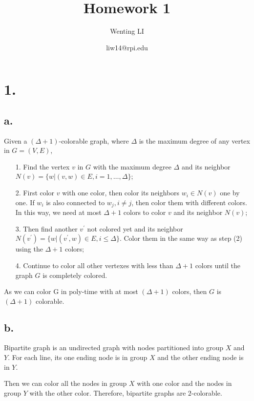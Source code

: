 \documentclass[a4paper,12pt]{article}
\begin{document}
	\title{Homework 1}
	\author{
			Wenting LI
		\and
			liw14@rpi.edu
			}
	\maketitle


 \section*{1. }
\subsection*{a. }
Given a $(\Delta+1)$-colorable graph, where $\Delta$ is the maximum degree of any vertex in $G=(V,E)$,

\begin{enumerate}
\item[1. ]Find the vertex $v$ in $G$ with the maximum degree $\Delta$ and its neighbor $N(v)=\{w | (v,w) \in E, i=1,\dots,\Delta \}$;

\item[2. ]First color $v$ with one color, then color its neighbors $w_i \in N(v)$ one by one. If $w_i$ is also connected to $w_j, i\neq j$, then color them with different colors. In this way, we need at most $\Delta +1$ colors to color $v$ and its neighbor  $N(v)$;

\item[3. ]Then find another $v^{\prime}$ not colored yet and its neighbor $N(v^{\prime})=\{w | (v^{\prime},w) \in E, i\leq \Delta \}$. Color them in the same way as step (2) using the $\Delta +1$ colors;

\item[4. ]Continue to color all other vertexes with less than $\Delta +1$ colors until the graph $G$ is completely colored.
\end{enumerate}

As we can color G in poly-time with at most $(\Delta +1)$ colors, then $G$ is $(\Delta +1)$ colorable.
\subsection*{b. }
Bipartite graph is an undirected graph with nodes partitioned into group $X$ and $Y$. For each line, its one ending node is in group $X$ and the other ending node is in $Y$. 

Then we can color all the nodes in group $X$ with one color and the nodes in group $Y$ with the other color. Therefore, bipartite graphs are $2$-colorable. 
\end{document}
